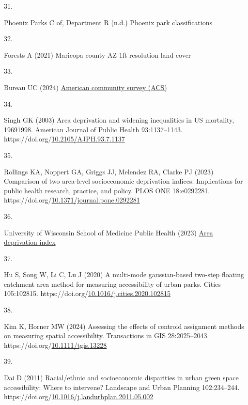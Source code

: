 \documentclass[
  sn-basic,
]{sn-jnl}
\newlength{\cslhangindent}
\newlength{\csllabelwidth}
\newenvironment{CSLReferences}[2] %
 {\begin{list}{}{%
  \setlength{\itemindent}{0pt}
  \setlength{\leftmargin}{0pt}
  \setlength{\parsep}{0pt}
  \ifodd #1
   \setlength{\leftmargin}{\cslhangindent}
   \setlength{\itemindent}{-1\cslhangindent}
  \fi
  \setlength{\itemsep}{#2\baselineskip}}}
 {\end{list}}
\newcommand{\CSLLeftMargin}[1]{\parbox[t]{\csllabelwidth}{\strut#1\strut}}
\newcommand{\CSLRightInline}[1]{\parbox[t]{\linewidth - \csllabelwidth}{\strut#1\strut}}
\begin{document}
\begin{CSLReferences}{0}{1}
\CSLLeftMargin{31. }%
\CSLRightInline{Phoenix Parks C of, Department R (n.d.) Phoenix park
classifications}

\CSLLeftMargin{32. }%
\CSLRightInline{Forests A (2021) Maricopa county AZ 1ft resolution land
cover}

\CSLLeftMargin{33. }%
\CSLRightInline{Bureau UC (2024)
\href{https://www.census.gov/programs-surveys/acs/}{American community
survey (ACS)}}

\CSLLeftMargin{34. }%
\CSLRightInline{Singh GK (2003) Area deprivation and widening
inequalities in US mortality, 1969{\textendash}1998. American Journal of
Public Health 93:1137--1143.
https://doi.org/\href{https://doi.org/10.2105/AJPH.93.7.1137}{10.2105/AJPH.93.7.1137}}

\CSLLeftMargin{35. }%
\CSLRightInline{Rollings KA, Noppert GA, Griggs JJ, Melendez RA, Clarke
PJ (2023) Comparison of two area-level socioeconomic deprivation
indices: Implications for public health research, practice, and policy.
PLOS ONE 18:e0292281.
https://doi.org/\href{https://doi.org/10.1371/journal.pone.0292281}{10.1371/journal.pone.0292281}}

\CSLLeftMargin{36. }%
\CSLRightInline{University of Wisconsin School of Medicine Public Health
(2023) \href{https://www.neighborhoodatlas.medicine.wisc.edu/}{Area
deprivation index}}

\CSLLeftMargin{37. }%
\CSLRightInline{Hu S, Song W, Li C, Lu J (2020) A multi-mode
gaussian-based two-step floating catchment area method for measuring
accessibility of urban parks. Cities 105:102815.
https://doi.org/\href{https://doi.org/10.1016/j.cities.2020.102815}{10.1016/j.cities.2020.102815}}

\CSLLeftMargin{38. }%
\CSLRightInline{Kim K, Horner MW (2024) Assessing the effects of
centroid assignment methods on measuring spatial accessibility.
Transactions in GIS 28:2025--2043.
https://doi.org/\href{https://doi.org/10.1111/tgis.13228}{10.1111/tgis.13228}}

\CSLLeftMargin{39. }%
\CSLRightInline{Dai D (2011) Racial/ethnic and socioeconomic disparities
in urban green space accessibility: Where to intervene? Landscape and
Urban Planning 102:234--244.
https://doi.org/\href{https://doi.org/10.1016/j.landurbplan.2011.05.002}{10.1016/j.landurbplan.2011.05.002}}


\end{CSLReferences}
\end{document}
